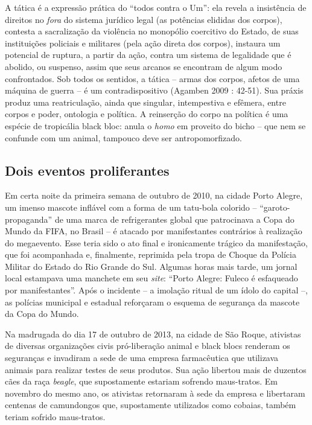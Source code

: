 A tática é a expressão prática do ``todos contra o Um'': ela revela a
insistência de direitos no \emph{fora} do sistema jurídico legal (as
potências elididas dos corpos), contesta a sacralização da violência no
monopólio coercitivo do Estado, de suas instituições policiais e
militares (pela ação direta dos corpos), instaura um potencial de
ruptura, a partir da ação, contra um sistema de legalidade que é
abolido, ou suspenso, assim que seus arcanos se encontram de algum modo
confrontados. Sob todos os sentidos, a tática -- armas dos corpos,
afetos de uma máquina de guerra -- é um contradispositivo (Agamben 2009
: 42-51). Sua práxis produz uma reatriculação, ainda que singular,
intempestiva e efêmera, entre corpos e poder, ontologia e política. A
reinserção do corpo na política é uma espécie de tropicália black bloc:
anula o \emph{homo} em proveito do bicho -- que nem se confunde com um
animal, tampouco deve ser antropomorfizado.

\subsection{Dois eventos proliferantes}

Em certa noite da primeira semana
de outubro de 2010, na cidade Porto Alegre, um imenso mascote inflável
com a forma de um tatu-bola colorido -- ``garoto-propaganda'' de uma
marca de refrigerantes global que patrocinava a Copa do Mundo da FIFA,
no Brasil -- é atacado por manifestantes contrários à realização do
megaevento. Esse teria sido o ato final e ironicamente trágico da
manifestação, que foi acompanhada e, finalmente, reprimida pela tropa de
Choque da Polícia Militar do Estado do Rio Grande do Sul. Algumas horas
mais tarde, um jornal local estampava uma manchete em seu \emph{site}:
``Porto Alegre: Fuleco é esfaqueado por manifestantes''. Após o
incidente -- a imolação ritual de um ídolo do capital --, as polícias
municipal e estadual reforçaram o esquema de segurança da mascote da
Copa do Mundo.

Na madrugada do dia 17 de outubro de 2013, na cidade de São Roque,
ativistas de diversas organizações civis pró-liberação animal e black
blocs renderam os seguranças e invadiram a sede de uma empresa
farmacêutica que utilizava animais para realizar testes de seus
produtos. Sua ação libertou mais de duzentos cães da raça \emph{beagle},
que supostamente estariam sofrendo maus-tratos. Em novembro do mesmo
ano, os ativistas retornaram à sede da empresa e libertaram centenas de
camundongos que, supostamente utilizados como cobaias, também teriam
sofrido maus-tratos.

